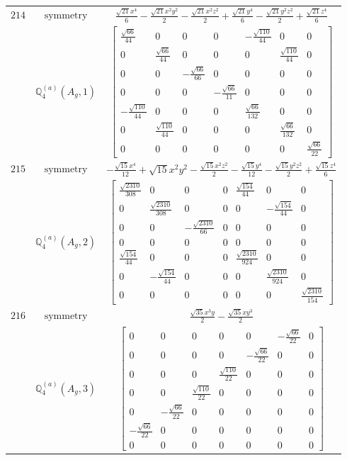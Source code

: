 \documentclass[fleqn,8pt,landscape]{jsarticle}
\begin{document}
\begin{longtable}{ccc}
$ 214 $ & $ \text{symmetry} $ & $ \frac{\sqrt{21} x^{4}}{6} - \frac{\sqrt{21} x^{2} y^{2}}{2} - \frac{\sqrt{21} x^{2} z^{2}}{2} + \frac{\sqrt{21} y^{4}}{6} - \frac{\sqrt{21} y^{2} z^{2}}{2} + \frac{\sqrt{21} z^{4}}{6} $ \\
$  $ & $ \mathbb{Q}_{4}^{(a)}(A_{g},1) $ & $ \begin{bmatrix} \frac{\sqrt{66}}{44} & 0 & 0 & 0 & - \frac{\sqrt{110}}{44} & 0 & 0 \\ 0 & \frac{\sqrt{66}}{44} & 0 & 0 & 0 & \frac{\sqrt{110}}{44} & 0 \\ 0 & 0 & - \frac{\sqrt{66}}{66} & 0 & 0 & 0 & 0 \\ 0 & 0 & 0 & - \frac{\sqrt{66}}{11} & 0 & 0 & 0 \\ - \frac{\sqrt{110}}{44} & 0 & 0 & 0 & \frac{\sqrt{66}}{132} & 0 & 0 \\ 0 & \frac{\sqrt{110}}{44} & 0 & 0 & 0 & \frac{\sqrt{66}}{132} & 0 \\ 0 & 0 & 0 & 0 & 0 & 0 & \frac{\sqrt{66}}{22} \end{bmatrix} $ \\ \hline
$ 215 $ & $ \text{symmetry} $ & $ - \frac{\sqrt{15} x^{4}}{12} + \sqrt{15} x^{2} y^{2} - \frac{\sqrt{15} x^{2} z^{2}}{2} - \frac{\sqrt{15} y^{4}}{12} - \frac{\sqrt{15} y^{2} z^{2}}{2} + \frac{\sqrt{15} z^{4}}{6} $ \\
$  $ & $ \mathbb{Q}_{4}^{(a)}(A_{g},2) $ & $ \begin{bmatrix} \frac{\sqrt{2310}}{308} & 0 & 0 & 0 & \frac{\sqrt{154}}{44} & 0 & 0 \\ 0 & \frac{\sqrt{2310}}{308} & 0 & 0 & 0 & - \frac{\sqrt{154}}{44} & 0 \\ 0 & 0 & - \frac{\sqrt{2310}}{66} & 0 & 0 & 0 & 0 \\ 0 & 0 & 0 & 0 & 0 & 0 & 0 \\ \frac{\sqrt{154}}{44} & 0 & 0 & 0 & \frac{\sqrt{2310}}{924} & 0 & 0 \\ 0 & - \frac{\sqrt{154}}{44} & 0 & 0 & 0 & \frac{\sqrt{2310}}{924} & 0 \\ 0 & 0 & 0 & 0 & 0 & 0 & \frac{\sqrt{2310}}{154} \end{bmatrix} $ \\ \hline
$ 216 $ & $ \text{symmetry} $ & $ \frac{\sqrt{35} x^{3} y}{2} - \frac{\sqrt{35} x y^{3}}{2} $ \\
$  $ & $ \mathbb{Q}_{4}^{(a)}(A_{g},3) $ & $ \begin{bmatrix} 0 & 0 & 0 & 0 & 0 & - \frac{\sqrt{66}}{22} & 0 \\ 0 & 0 & 0 & 0 & - \frac{\sqrt{66}}{22} & 0 & 0 \\ 0 & 0 & 0 & \frac{\sqrt{110}}{22} & 0 & 0 & 0 \\ 0 & 0 & \frac{\sqrt{110}}{22} & 0 & 0 & 0 & 0 \\ 0 & - \frac{\sqrt{66}}{22} & 0 & 0 & 0 & 0 & 0 \\ - \frac{\sqrt{66}}{22} & 0 & 0 & 0 & 0 & 0 & 0 \\ 0 & 0 & 0 & 0 & 0 & 0 & 0 \end{bmatrix} $ \\ \hline

\end{longtable}
\end{document}
